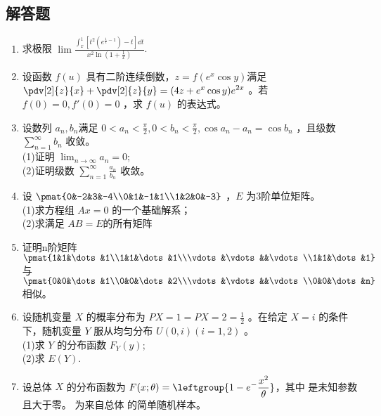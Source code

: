 \subsection{解答题}
\begin{enumerate}
\item 求极限 $\displaystyle \lim \frac{\int_{x}^{1} [t^2(e^{\frac{1}{t}-1})-t]\dd{t}}{x^2\ln(1+\frac{1}{x})}$.
\item 设函数 $f(u)$ 具有二阶连续倒数，$z=f(e^x\cos y)$满足 $\displaystyle \pdv[2]{z}{x}+\pdv[2]{z}{y}=(4z+e^x\cos y)e^{2x}$  。若 $f(0)=0,f'(0)=0$ ，求 $f(u)$ 的表达式。
\item 设数列 ${a_n},{b_n}$满足 $\displaystyle 0<a_n<\frac{\pi}{2},0<b_n<\frac{\pi}{2},\cos a_n-a_n=\cos b_n$ ，且级数 $\displaystyle \sum_{n=1}^\infty b_n$  收敛。\\
(1)证明 $\lim_{n\to\infty} a_n=0;$\\
(2)证明级数 $\displaystyle \sum_{n=1}^\infty \frac{a_n}{b_n}$  收敛。
\item 设 $\pmat{0&-2&3&-4\\0&1&-1&1\\1&2&0&-3}$ ，$ E$  为3阶单位矩阵。\\
(1)求方程组 $Ax=0$ 的一个基础解系；\\
(2)求满足 $AB=E$的所有矩阵 
\item 证明n阶矩阵 $\pmat{1&1&\dots&1\\1&1&\dots&1\\\vdots&\vdots&&\vdots\\1&1&\dots&1}$ 与 $\pmat{0&0&\dots&1\\0&0&\dots&2\\\vdots&\vdots&&\vdots\\0&0&\dots&n}$ 相似。
\item 设随机变量 $X$ 的概率分布为 $P{X=1}=P{X=2}=\frac{1}{2}$ 。在给定 $X=i$ 的条件下，随机变量 $Y$ 服从均匀分布 $U(0,i)(i=1,2)$ 。\\
(1)求 $Y$ 的分布函数 $F_Y(y)$;\\
(2)求 $E(Y)$.
\item 设总体 $X$ 的分布函数为 $\displaystyle F(x;\theta)=\leftgroup{1-e^-{\frac{x^2}{\theta}}}$，其中  是未知参数且大于零。  为来自总体  的简单随机样本。
\end{enumerate}
